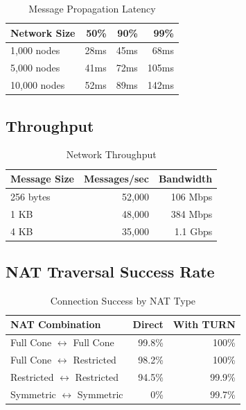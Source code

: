 \documentclass[11pt,a4paper]{article}
\begin{document}
\begin{table}[htbp]
\centering
\caption{Message Propagation Latency}
\begin{tabular}{lrrr}
\toprule
\textbf{Network Size} & \textbf{50\%} & \textbf{90\%} & \textbf{99\%} \\
\midrule
1,000 nodes & 28ms & 45ms & 68ms \\
5,000 nodes & 41ms & 72ms & 105ms \\
10,000 nodes & 52ms & 89ms & 142ms \\
\bottomrule
\end{tabular}
\label{tab:latency}
\end{table}

\subsection{Throughput}

\begin{table}[htbp]
\centering
\caption{Network Throughput}
\begin{tabular}{lrr}
\toprule
\textbf{Message Size} & \textbf{Messages/sec} & \textbf{Bandwidth} \\
\midrule
256 bytes & 52,000 & 106 Mbps \\
1 KB & 48,000 & 384 Mbps \\
4 KB & 35,000 & 1.1 Gbps \\
\bottomrule
\end{tabular}
\label{tab:throughput}
\end{table}

\subsection{NAT Traversal Success Rate}

\begin{table}[htbp]
\centering
\caption{Connection Success by NAT Type}
\begin{tabular}{lrr}
\toprule
\textbf{NAT Combination} & \textbf{Direct} & \textbf{With TURN} \\
\midrule
Full Cone $\leftrightarrow$ Full Cone & 99.8\% & 100\% \\
Full Cone $\leftrightarrow$ Restricted & 98.2\% & 100\% \\
Restricted $\leftrightarrow$ Restricted & 94.5\% & 99.9\% \\
Symmetric $\leftrightarrow$ Symmetric & 0\% & 99.7\% \\
\bottomrule
\end{tabular}
\label{tab:nat}
\end{table}
\end{document}

